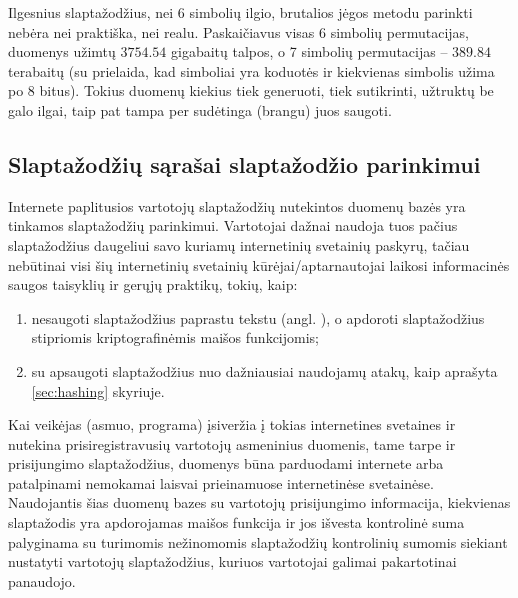 \documentclass{VUMIFInfBakalaurinis}
\begin{document}
Ilgesnius slaptažodžius, nei 6 simbolių ilgio, brutalios jėgos metodu parinkti 
nebėra nei praktiška, nei realu. Paskaičiavus visas 6 simbolių permutacijas, 
duomenys užimtų $3754.54$ gigabaitų talpos, o 7 simbolių permutacijas -- 
$389.84$ terabaitų (su prielaida, kad simboliai yra  koduotės 
ir kiekvienas simbolis užima po 8 bitus). Tokius duomenų kiekius tiek generuoti, 
tiek sutikrinti, užtruktų be galo ilgai, taip pat tampa per sudėtinga (brangu) 
juos saugoti.

\subsection{Slaptažodžių sąrašai slaptažodžio parinkimui} \label{sec:wordlists}
Internete paplitusios vartotojų slaptažodžių nutekintos duomenų bazės yra 
tinkamos slaptažodžių parinkimui. Vartotojai dažnai naudoja tuos pačius 
slaptažodžius daugeliui savo kuriamų internetinių svetainių paskyrų, tačiau 
nebūtinai visi šių internetinių svetainių kūrėjai/aptarnautojai laikosi
informacinės saugos taisyklių ir gerųjų praktikų, tokių, kaip:
\begin{enumerate}
  \item nesaugoti slaptažodžius paprastu tekstu (angl. ), 
        o apdoroti slaptažodžius stipriomis kriptografinėmis maišos funkcijomis;
  \item su  apsaugoti slaptažodžius nuo dažniausiai naudojamų 
        atakų, kaip aprašyta \ref{sec:hashing} skyriuje.
\end{enumerate}

Kai veikėjas (asmuo, programa) įsiveržia į tokias internetines svetaines ir 
nutekina prisiregistravusių vartotojų asmeninius duomenis, tame tarpe ir 
prisijungimo slaptažodžius, duomenys būna parduodami internete arba patalpinami 
nemokamai laisvai prieinamuose internetinėse svetainėse. Naudojantis šias 
duomenų bazes su vartotojų prisijungimo informacija, kiekvienas slaptažodis yra 
apdorojamas maišos funkcija ir jos išvesta kontrolinė suma palyginama su 
turimomis nežinomomis slaptažodžių kontrolinių sumomis siekiant nustatyti 
vartotojų slaptažodžius, kuriuos vartotojai galimai pakartotinai panaudojo.
\end{document}
